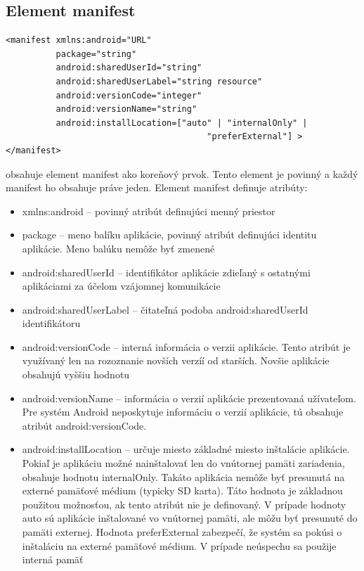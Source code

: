 \subsection{Element manifest}
\lstset{language=XML}
\begin{lstlisting}
<manifest xmlns:android="URL"
          package="string"
          android:sharedUserId="string"
          android:sharedUserLabel="string resource"
          android:versionCode="integer"
          android:versionName="string"
          android:installLocation=["auto" | "internalOnly" |
                                        "preferExternal"] >
</manifest>
\end{lstlisting}
 obsahuje element manifest ako koreňový prvok. Tento element je povinný a každý manifest ho obsahuje práve jeden. \newline\newline
\noindent Element manifest definuje atribúty:\\
\begin{itemize}
\item xmlns:android – povinný atribút definujúci menný priestor
\item package – meno balíku aplikácie, povinný atribút definujúci identitu aplikácie. Meno balúku nemôže byť zmenené
\item android:sharedUserId – identifikátor aplikácie zdieľaný s ostatnými aplikáciami za účelom vzájomnej komunikácie
\item android:sharedUserLabel – čitateľná podoba android:sharedUserId identifikátoru
\item android:versionCode – interná informácia o verzii aplikácie. Tento atribút je využívaný len na rozoznanie novších verzíí od starších. Novšie aplikácie obsahujú vyššiu hodnotu
\item android:versionName – informácia o verzií aplikácie prezentovaná užívateľom. Pre systém Android neposkytuje informáciu o verzií aplikácie, tú obsahuje atribút android:versionCode.
\item android:installLocation – určuje miesto základné miesto inštalácie aplikácie. Pokiaľ je aplikáciu možné nainštalovať len do vnútornej pamäti zariadenia, obsahuje hodnotu internalOnly. Takáto aplikácia nemôže byť presunutá na externé pamäťové médium (typicky SD karta). Táto hodnota je základnou použitou možnosťou, ak tento atribút nie je definovaný. V prípade hodnoty auto sú aplikácie inštalované vo vnútornej pamäti, ale môžu byť presunuté do pamäti externej. Hodnota preferExternal zabezpečí, že systém sa pokúsi o inštaláciu na externé pamäťové médium. V prípade neúspechu sa použije interná pamäť
\end{itemize}

